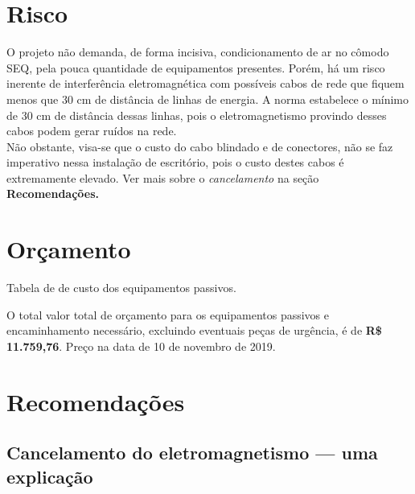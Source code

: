 \documentclass[	DIV=calc,%
							paper=a4,%
							fontsize=12pt,%
							onecolumn]{scrartcl}	 					%
\begin{document}
\section{Risco}

O projeto não demanda, de forma incisiva, condicionamento de ar no cômodo SEQ, pela pouca quantidade de equipamentos presentes. Porém, há um risco inerente de interferência eletromagnética com possíveis cabos de rede que fiquem menos que 30 cm de distância de linhas de energia. A norma estabelece o mínimo de 30 cm de distância dessas linhas, pois o eletromagnetismo provindo desses cabos podem gerar ruídos na rede.
\\

Não obstante, visa-se que o custo do cabo blindado e de conectores, não se faz imperativo nessa instalação de escritório, pois o custo destes cabos é extremamente elevado. Ver mais sobre o \textit{cancelamento} na seção \textbf{Recomendações.}



\section{Orçamento}
Tabela de de custo dos equipamentos passivos.






O total valor total de orçamento para os equipamentos passivos e encaminhamento necessário, excluindo eventuais peças de urgência, é de \textbf{R\$ 11.759,76}.
Preço na data de 10 de novembro de 2019.

\pagebreak

\section{Recomendações}

\subsection{Cancelamento do eletromagnetismo --- uma explicação}
\end{document}
